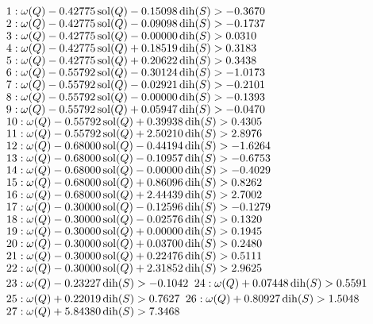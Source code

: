 $1:  \omega(Q) - 0.42775 \operatorname{sol}(Q) - 0.15098 \operatorname{dih}(S) > -0.3670$\newline
$2:  \omega(Q) - 0.42775 \operatorname{sol}(Q) - 0.09098 \operatorname{dih}(S) > -0.1737$\newline
$3:  \omega(Q) - 0.42775 \operatorname{sol}(Q) - 0.00000 \operatorname{dih}(S) > 0.0310$\newline
$4:  \omega(Q) - 0.42775 \operatorname{sol}(Q) + 0.18519 \operatorname{dih}(S) > 0.3183$\newline
$5:  \omega(Q) - 0.42775 \operatorname{sol}(Q) + 0.20622 \operatorname{dih}(S) > 0.3438$\newline
$6:  \omega(Q) - 0.55792 \operatorname{sol}(Q) - 0.30124 \operatorname{dih}(S) > -1.0173$\newline
$7:  \omega(Q) - 0.55792 \operatorname{sol}(Q) - 0.02921 \operatorname{dih}(S) > -0.2101$\newline
$8:  \omega(Q) - 0.55792 \operatorname{sol}(Q) - 0.00000 \operatorname{dih}(S) > -0.1393$\newline
$9:  \omega(Q) - 0.55792 \operatorname{sol}(Q) + 0.05947 \operatorname{dih}(S) > -0.0470$\newline
$10:  \omega(Q) - 0.55792 \operatorname{sol}(Q) + 0.39938 \operatorname{dih}(S) > 0.4305$\newline
$11:  \omega(Q) - 0.55792 \operatorname{sol}(Q) + 2.50210 \operatorname{dih}(S) > 2.8976$\newline
$12:  \omega(Q) - 0.68000 \operatorname{sol}(Q) - 0.44194 \operatorname{dih}(S) > -1.6264$\newline
$13:  \omega(Q) - 0.68000 \operatorname{sol}(Q) - 0.10957 \operatorname{dih}(S) > -0.6753$\newline
$14:  \omega(Q) - 0.68000 \operatorname{sol}(Q) - 0.00000 \operatorname{dih}(S) > -0.4029$\newline
$15:  \omega(Q) - 0.68000 \operatorname{sol}(Q) + 0.86096 \operatorname{dih}(S) > 0.8262$\newline
$16:  \omega(Q) - 0.68000 \operatorname{sol}(Q) + 2.44439 \operatorname{dih}(S) > 2.7002$\newline
$17:  \omega(Q) - 0.30000 \operatorname{sol}(Q) - 0.12596 \operatorname{dih}(S) > -0.1279$\newline
$18:  \omega(Q) - 0.30000 \operatorname{sol}(Q) - 0.02576 \operatorname{dih}(S) > 0.1320$\newline
$19:  \omega(Q) - 0.30000 \operatorname{sol}(Q) + 0.00000 \operatorname{dih}(S) > 0.1945$\newline
$20:  \omega(Q) - 0.30000 \operatorname{sol}(Q) + 0.03700 \operatorname{dih}(S) > 0.2480$\newline
$21:  \omega(Q) - 0.30000 \operatorname{sol}(Q) + 0.22476 \operatorname{dih}(S) > 0.5111$\newline
$22:  \omega(Q) - 0.30000 \operatorname{sol}(Q) + 2.31852 \operatorname{dih}(S) > 2.9625$\newline
$23:  \omega(Q) - 0.23227 \operatorname{dih}(S) > -0.1042$\newline
$24:  \omega(Q) + 0.07448 \operatorname{dih}(S) > 0.5591$\newline
$25:  \omega(Q) + 0.22019 \operatorname{dih}(S) > 0.7627$\newline
$26:  \omega(Q) + 0.80927 \operatorname{dih}(S) > 1.5048$\newline
$27:  \omega(Q) + 5.84380 \operatorname{dih}(S) > 7.3468$\newline



